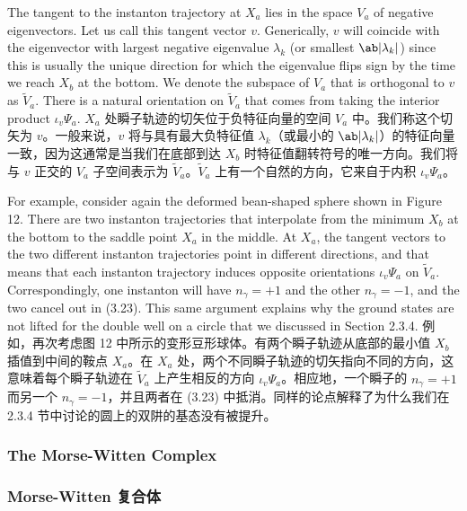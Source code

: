 \documentclass{ctexart}
\begin{document}
\begin{paracol}{2}
The tangent to the instanton trajectory at $X_a$ lies in the space $V_a$ of negative eigenvectors. Let us call this tangent vector $v$. Generically, $v$ will coincide with the eigenvector with largest negative eigenvalue $\lambda_k$ (or smallest $\ab|\lambda_k|$) since this is usually the unique direction for which the eigenvalue flips sign by the time we reach $X_b$ at the bottom. We denote the subspace of $V_a$ that is orthogonal to $v$ as $\tilde{V}_a$. There is a natural orientation on $\tilde{V}_a$ that comes from taking the interior product $\iota_v \Psi_a$.
\switchcolumn
$X_a$ 处瞬子轨迹的切矢位于负特征向量的空间 $V_a$ 中。我们称这个切矢为 $v$。一般来说，$v$ 将与具有最大负特征值 $\lambda_k$（或最小的 $\ab|\lambda_k|$）的特征向量一致，因为这通常是当我们在底部到达 $X_b$ 时特征值翻转符号的唯一方向。我们将与 $v$ 正交的 $V_a$ 子空间表示为 $\tilde{V}_a$。$\tilde{V}_a$ 上有一个自然的方向，它来自于内积 $\iota_v \Psi_a$。
\switchcolumn*

For example, consider again the deformed bean-shaped sphere shown in Figure 12. There are two instanton trajectories that interpolate from the minimum $X_b$ at the bottom to the saddle point $X_a$ in the middle. At $X_a$, the tangent vectors to the two different instanton trajectories point in different directions, and that means that each instanton trajectory induces opposite orientations $\iota_v \Psi_a$ on $\tilde{V}_a$. Correspondingly, one instanton will have $n_{\gamma} = + 1$ and the other $n_{\gamma} = - 1$, and the two cancel out in (3.23). This same argument explains why the ground states are not lifted for the double well on a circle that we discussed in Section 2.3.4.
\switchcolumn
例如，再次考虑图 12 中所示的变形豆形球体。有两个瞬子轨迹从底部的最小值 $X_b$ 插值到中间的鞍点 $X_a$。在 $X_a$ 处，两个不同瞬子轨迹的切矢指向不同的方向，这意味着每个瞬子轨迹在 $\tilde{V}_a$ 上产生相反的方向 $\iota_v \Psi_a$。相应地，一个瞬子的 $n_{\gamma} = + 1$ 而另一个 $n_{\gamma} = - 1$，并且两者在 (3.23) 中抵消。同样的论点解释了为什么我们在 2.3.4 节中讨论的圆上的双阱的基态没有被提升。
\switchcolumn*

\subsubsection{The Morse-Witten Complex}
\switchcolumn
\subsubsection*{Morse-Witten 复合体}
\switchcolumn*


\end{paracol}
\end{document}
